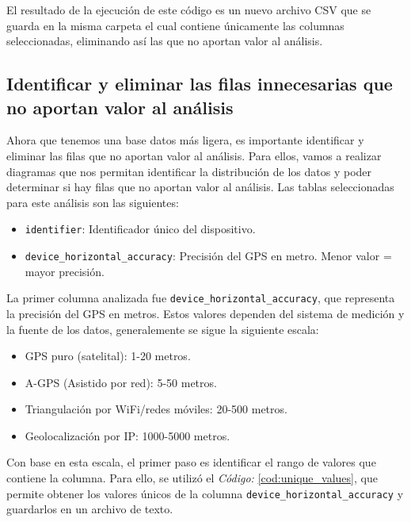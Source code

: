\noindent El resultado de la ejecución de este código es un nuevo archivo CSV que se guarda en la misma carpeta el cual contiene únicamente las columnas seleccionadas, eliminando así las que no aportan valor al análisis. 

\newpage
\subsection{Identificar y eliminar las filas innecesarias que no aportan valor al análisis}
\noindent Ahora que tenemos una base datos más ligera, es importante identificar y eliminar las filas que no aportan valor al análisis. Para ellos, vamos a realizar diagramas que nos permitan identificar la distribución de los datos y poder determinar si hay filas que no aportan valor al análisis. Las tablas seleccionadas para este análisis son las siguientes:
\begin{itemize}
    \item \texttt{identifier}: Identificador único del dispositivo.
    \item \texttt{device\_horizontal\_accuracy}: Precisión del GPS en metro. Menor valor = mayor precisión. 
\end{itemize}

\noindent La primer columna analizada fue \texttt{device\_horizontal\_accuracy}, que representa la precisión del GPS en metros. Estos valores dependen del sistema de medición y la fuente de los datos, generalemente se sigue la siguiente escala:
\begin{itemize}
    \item GPS puro (satelital): 1-20 metros.
    \item A-GPS (Asistido por red): 5-50 metros.
    \item Triangulación por WiFi/redes móviles: 20-500 metros.
    \item Geolocalización por IP: 1000-5000 metros.
\end{itemize}

\noindent Con base en esta escala, el primer paso es identificar el rango de valores que contiene la columna. Para ello, se utilizó el \textit{Código:} \ref{cod:unique_values}, que permite obtener los valores únicos de la columna \texttt{device\_horizontal\_accuracy} y guardarlos en un archivo de texto. 


